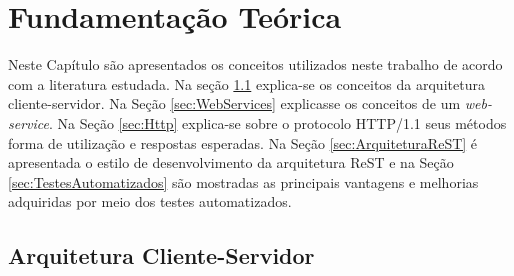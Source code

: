 
\chapter{Fundamentação Teórica}\label{cap:funTeorica}

Neste Capítulo são apresentados os conceitos utilizados neste trabalho de acordo com a literatura estudada. Na seção \ref{sec:ArquiteturaClienteServidor} explica-se os conceitos da arquitetura cliente-servidor. Na Seção \ref{sec:WebServices} explicasse os conceitos de um \textit{web-service}. Na Seção \ref{sec:Http} explica-se sobre o protocolo HTTP/1.1 seus métodos forma de utilização e respostas esperadas. Na Seção \ref{sec:ArquiteturaReST} é apresentada o estilo de desenvolvimento da arquitetura ReST e na Seção \ref{sec:TestesAutomatizados} são mostradas as principais vantagens e melhorias adquiridas por meio dos testes automatizados.


\section{Arquitetura Cliente-Servidor}\label{sec:ArquiteturaClienteServidor}

